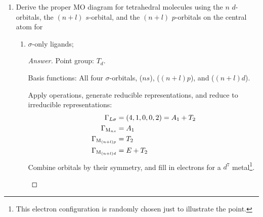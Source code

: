 \documentclass[../psets.tex]{subfiles}
\begin{document}
\begin{enumerate}[label={\Roman*)}]
    \item {}Derive the proper MO diagram for tetrahedral molecules  using the $n$ $d$-orbitals, the $(n+l)$ $s$-orbital, and the $(n+l)$ $p$-orbitals on the central atom  for
    \begin{enumerate}
        \item $\sigma$-only ligands;
        \begin{proof}[Answer]
            Point group: $T_d$.\par
            Basis functions: All four  $\sigma$-orbitals, ($ns$), ($(n+l)p$), and ($(n+l)d$).\par
            Apply operations, generate reducible representations, and reduce to irreducible representations:
            \begin{align*}
                \Gamma_{L\sigma} &= (4,1,0,0,2) = A_1+T_2\\
                \Gamma_{\ce{M}_{ns}} &= A_1\\
                \Gamma_{\ce{M}_{(n+l)p}} &= T_2\\
                \Gamma_{\ce{M}_{(n+l)d}} &= E+T_2
            \end{align*}
            Combine orbitals by their symmetry, and fill in electrons for a $d^7$ metal\footnote{This electron configuration is randomly chosen just to illustrate the point.}.
            \begin{center}
\end{center}
\end{proof}
\end{enumerate}
\end{enumerate}
\end{document}
